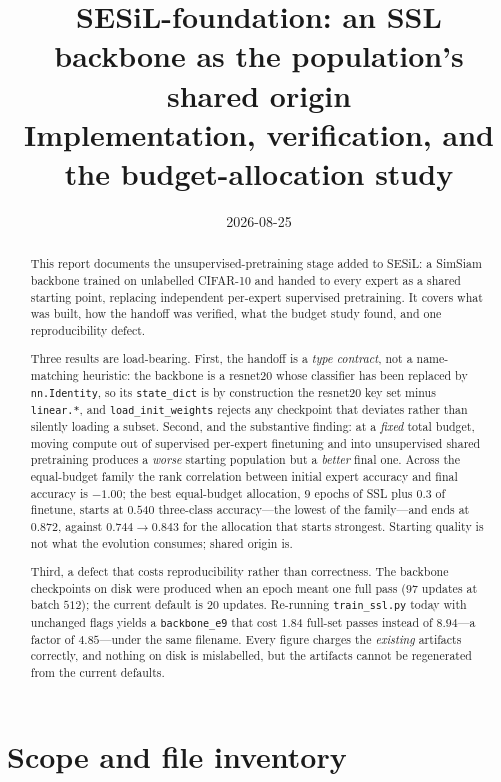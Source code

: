 \documentclass[11pt,a4paper]{article}
\title{\textbf{SESiL-foundation: an SSL backbone as the population's shared
origin}\\
\large Implementation, verification, and the budget-allocation study}
\author{}
\date{2026-08-25}
\newcommand{\code}[1]{\texttt{\small #1}}
\newcommand{\file}[1]{\texttt{\small #1}}
\begin{document}
\maketitle

\begin{abstract}
This report documents the unsupervised-pretraining stage added to SESiL: a
SimSiam backbone trained on unlabelled CIFAR-10 and handed to every expert as a
shared starting point, replacing independent per-expert supervised pretraining.
It covers what was built, how the handoff was verified, what the budget study
found, and one reproducibility defect.

Three results are load-bearing. First, the handoff is a \emph{type contract},
not a name-matching heuristic: the backbone is a resnet20 whose classifier has
been replaced by \code{nn.Identity}, so its \code{state\_dict} is by
construction the resnet20 key set minus \code{linear.*}, and
\code{load\_init\_weights} rejects any checkpoint that deviates rather than
silently loading a subset. Second, and the substantive finding: at a
\emph{fixed} total budget, moving compute out of supervised per-expert
finetuning and into unsupervised shared pretraining produces a
\emph{worse} starting population but a \emph{better} final one. Across the
equal-budget family the rank correlation between initial expert accuracy and
final accuracy is $-1.00$; the best equal-budget allocation, $9$ epochs of SSL
plus $0.3$ of finetune, starts at $0.540$ three-class accuracy---the lowest of
the family---and ends at $0.872$, against $0.744 \to 0.843$ for the allocation
that starts strongest. Starting quality is not what the evolution consumes;
shared origin is.

Third, a defect that costs reproducibility rather than correctness. The
backbone checkpoints on disk were produced when an epoch meant one full pass
($97$ updates at batch $512$); the current default is $20$ updates. Re-running
\file{train\_ssl.py} today with unchanged flags yields a \code{backbone\_e9}
that cost $1.84$ full-set passes instead of $8.94$---a factor of $4.85$---under
the same filename. Every figure charges the \emph{existing} artifacts
correctly, and nothing on disk is mislabelled, but the artifacts cannot be
regenerated from the current defaults.
\end{abstract}

\tableofcontents
\newpage

\section{Scope and file inventory}
\end{document}
